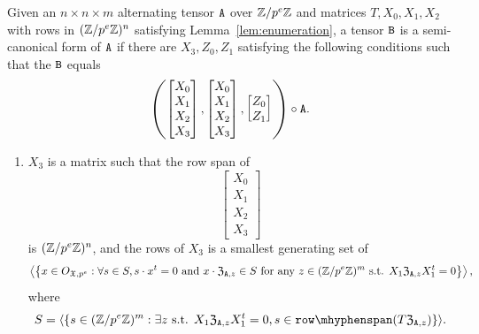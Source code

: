 \begin{definition}\label{def:semi_canonical}
Given an $n\times n \times m$ alternating tensor $\mathtt{A}$ over $\mathbb{Z} / p^e \mathbb{Z}$ and matrices $T, X_0, X_1, X_2$ with rows in $(\mathbb{Z} / p^e \mathbb{Z})^n$ satisfying Lemma~\ref{lem:enumeration}, 
a tensor $\mathtt{B}$ is a semi-canonical form of $\mathtt{A}$ if there are $X_3, Z_0, Z_1$ satisfying the following conditions such that the $\mathtt{B}$ equals 
\[\left(\begin{bmatrix} X_0 \\ X_1 \\ X_2 \\ X_3 \end{bmatrix}, \begin{bmatrix} X_0 \\ X_1 \\ X_2 \\ X_3 \end{bmatrix}, \begin{bmatrix} Z_0 \\ Z_1\end{bmatrix}\right) \circ \mathtt{A}.\]



\begin{enumerate}
\item $X_3$ is a matrix such that the row span of 
\[\begin{bmatrix} X_0 \\ X_1 \\ X_2 \\ X_3 \end{bmatrix}\]
is $(\mathbb{Z} / p^e \mathbb{Z})^n$, and the rows of $X_3$ is a smallest generating set of 
\[\left\langle \left\{x \in O_{\mathfrak{X}, p^e} : \forall s \in S, s \cdot x^t = 0 \text{ and }  x \cdot \mathfrak{Z}_{\mathtt{A}, z} \in S 
\text{ for any } z \in (\mathbb{Z} / p^e \mathbb{Z})^m \text{ s.t. } X_1  \mathfrak{Z}_{\mathtt{A}, z} X_1^t = 0 \right\}\right\rangle,\]
where \[S = \langle \{s  \in (\Z / p^e \Z)^m : \exists z  \text{ s.t. }X_1 \mathfrak{Z}_{\tA, z} X_1^t = 0, s \in \rowspan(T \mathfrak{Z}_{\tA, z})\}\rangle.\]


\end{enumerate}
\end{definition}
